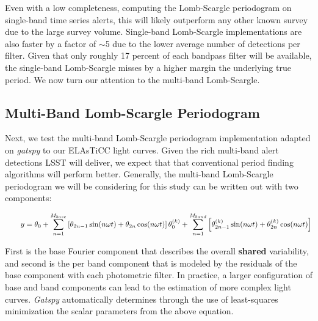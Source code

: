 \documentclass[DM,authoryear,toc]{lsstdoc}
\begin{document}
Even with a low completeness, computing the Lomb-Scargle periodogram on single-band time series alerts, this will likely outperform any other known survey due to the large survey volume. Single-band Lomb-Scargle implementations are also faster by a factor of $\sim$5 due to the lower average number of detections per filter. Given that only roughly 17 percent of each bandpass filter will be available, the single-band Lomb-Scargle misses by a higher margin the underlying true period. We now turn our attention to the multi-band Lomb-Scargle.

\subsection{Multi-Band Lomb-Scargle Periodogram}

Next, we test the multi-band Lomb-Scargle periodogram implementation adapted on \textit{gatspy} to our ELAsTiCC light curves. Given the rich multi-band alert detections LSST will deliver, we expect that that conventional period finding algorithms will perform better. Generally, the multi-band Lomb-Scargle periodogram we will be considering for this study can be written out with two components: 

\begin{equation}
\qquad y = \theta_0+\sum_{n=1}^{M_{base}}\left[\theta_{2 n-1} \sin (n \omega t)+\theta_{2 n} \cos (n \omega t)\right] \\
\theta_0^{(k)}+\sum_{n=1}^{M _{band}}\left[\theta_{2 n-1}^{(k)} \sin (n \omega t)+\theta_{2 n}^{(k)} \cos (n \omega t)\right]
\end{equation}

First is the base Fourier component that describes the overall \textbf{shared} variability, and second is the per band component that is modeled by the residuals of the base component with each photometric filter. In practice, a larger configuration of base and band components can lead to the estimation of more complex light curves. \textit{Gatspy} automatically determines through the use of least-squares minimization the scalar parameters from the above equation. 
\end{document}
